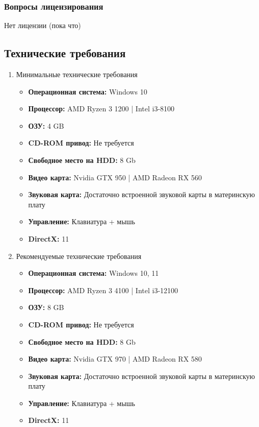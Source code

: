 \documentclass{article}
\begin{document}
\subsubsection{Вопросы лицензирования}

Нет лицензии (пока что)

\subsection{Технические требования}
\begin{enumerate}
    \item Минимальные технические требования
    \begin{itemize}
     \item \textbf{Операционная система: } Windows 10
     \item \textbf{Процессор: } AMD Ryzen 3 1200 | Intel i3-8100
     \item \textbf{ОЗУ: } 4 GB
     \item \textbf{CD-ROM привод: } Не требуется
     \item \textbf{Свободное место на HDD: } 8 Gb
     \item \textbf{Видео карта: } Nvidia GTX 950 | AMD Radeon RX 560
     \item \textbf{Звуковая карта: } Достаточно встроенной звуковой карты в материнскую плату
     \item \textbf{Управление: } Клавиатура + мышь
     \item \textbf{DirectX: } 11
    \end{itemize}
    \item Рекомендуемые технические требования
    \begin{itemize}
     \item \textbf{Операционная система: } Windows 10, 11 
     \item \textbf{Процессор: } AMD Ryzen 3 4100 | Intel i3-12100
     \item \textbf{ОЗУ: } 8 GB
     \item \textbf{CD-ROM привод: } Не требуется
     \item \textbf{Свободное место на HDD: } 8 Gb
     \item \textbf{Видео карта: } Nvidia GTX 970 | AMD Radeon RX 580
     \item \textbf{Звуковая карта: } Достаточно встроенной звуковой карты в материнскую плату
     \item \textbf{Управление: } Клавиатура + мышь
     \item \textbf{DirectX: } 11
    \end{itemize}
\end{enumerate}
\end{document}
